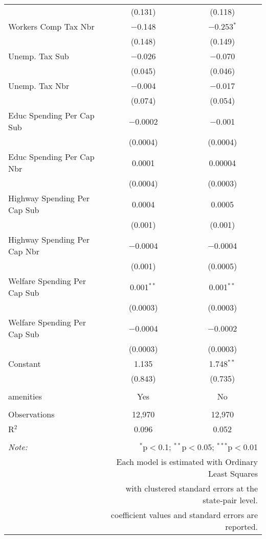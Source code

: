 \begin{table}[!htbp]
\begin{tabular}{@{\extracolsep{5pt}}lcc}
  & (0.131) & (0.118) \\ 
  Workers Comp Tax Nbr & $-$0.148 & $-$0.253$^{*}$ \\ 
  & (0.148) & (0.149) \\ 
  Unemp. Tax Sub & $-$0.026 & $-$0.070 \\ 
  & (0.045) & (0.046) \\ 
  Unemp. Tax Nbr & $-$0.004 & $-$0.017 \\ 
  & (0.074) & (0.054) \\ 
  Educ Spending Per Cap Sub & $-$0.0002 & $-$0.001 \\ 
  & (0.0004) & (0.0004) \\ 
  Educ Spending Per Cap Nbr & 0.0001 & 0.00004 \\ 
  & (0.0004) & (0.0003) \\ 
  Highway Spending Per Cap Sub & 0.0004 & 0.0005 \\ 
  & (0.001) & (0.001) \\ 
  Highway Spending Per Cap Nbr & $-$0.0004 & $-$0.0004 \\ 
  & (0.001) & (0.0005) \\ 
  Welfare Spending Per Cap Sub & 0.001$^{**}$ & 0.001$^{**}$ \\ 
  & (0.0003) & (0.0003) \\ 
  Welfare Spending Per Cap Sub & $-$0.0004 & $-$0.0002 \\ 
  & (0.0003) & (0.0003) \\ 
  Constant & 1.135 & 1.748$^{**}$ \\ 
  & (0.843) & (0.735) \\ 
 \hline \\[-1.8ex] 
amenities & Yes & No \\ 
\hline \\[-1.8ex] 
Observations & 12,970 & 12,970 \\ 
R$^{2}$ & 0.096 & 0.052 \\ 
\hline 
\hline \\[-1.8ex] 
\textit{Note:}  & \multicolumn{2}{r}{$^{*}$p$<$0.1; $^{**}$p$<$0.05; $^{***}$p$<$0.01} \\ 
 & \multicolumn{2}{r}{Each model is estimated with Ordinary Least Squares} \\ 
 & \multicolumn{2}{r}{with clustered standard errors at the state-pair level.} \\ 
 & \multicolumn{2}{r}{coefficient values and standard errors are reported.} \\ 
\end{tabular} 
\end{table} 
